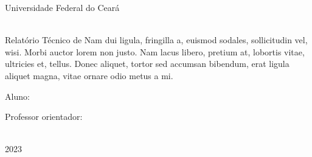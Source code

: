 \documentclass[a4paper, 12pt]{article}
\begin{document}
\begin{titlepage}
	\begin{center}
	

		\Huge{Universidade Federal do Ceará}\\
		\large{\projeto}\\ 
		 
\vspace{15pt}
        
        \vspace{85pt}
        
		\textbf{\LARGE{\relatorio}}
		\title{\large{\titulo}}
			
	\end{center}
\vspace{1,5cm}
	
	\begin{flushright}

   \begin{list}{}{
      \setlength{\leftmargin}{4.5cm}
      \setlength{\rightmargin}{0cm}
      \setlength{\labelwidth}{0pt}
      \setlength{\labelsep}{\leftmargin}}

      \item Relatório Técnico de Nam dui ligula, fringilla a, euismod sodales, sollicitudin vel, wisi. Morbi auctor lorem non
    justo. Nam lacus libero, pretium at, lobortis vitae, ultricies et, tellus. Donec aliquet, tortor
    sed accumsan bibendum, erat ligula aliquet magna, vitae ornare odio metus a mi.

      \begin{list}{}{
      \setlength{\leftmargin}{0cm}
      \setlength{\rightmargin}{0cm}
      \setlength{\labelwidth}{0pt}
      \setlength{\labelsep}{\leftmargin}}

			\item Aluno: \nome
            \item Professor orientador: \orientador\

      \end{list}
   \end{list}
\end{flushright}
\vspace{1cm}
\begin{center}
		\vspace{\fill}
		 \mes\\
		 2023
			\end{center}
\end{titlepage}
\newpage
\newpage
\tableofcontents
\thispagestyle{empty}
\end{document}
